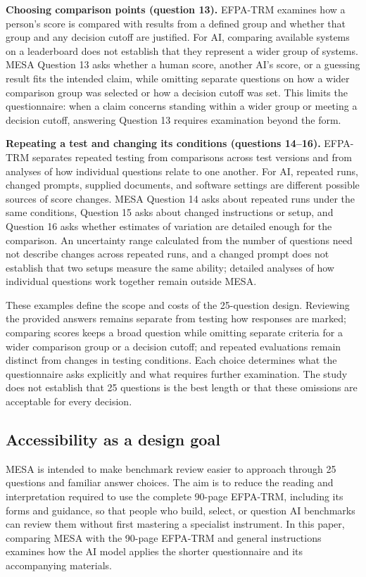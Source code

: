 \documentclass[10pt,conference]{IEEEtran}
\begin{document}
\textbf{Choosing comparison points (question 13).} EFPA-TRM examines how a person's score is compared with results from a defined group and whether that group and any decision cutoff are justified. For AI, comparing available systems on a leaderboard does not establish that they represent a wider group of systems. MESA Question 13 asks whether a human score, another AI's score, or a guessing result fits the intended claim, while omitting separate questions on how a wider comparison group was selected or how a decision cutoff was set. This limits the questionnaire: when a claim concerns standing within a wider group or meeting a decision cutoff, answering Question 13 requires examination beyond the form.

\textbf{Repeating a test and changing its conditions (questions 14--16).} EFPA-TRM separates repeated testing from comparisons across test versions and from analyses of how individual questions relate to one another. For AI, repeated runs, changed prompts, supplied documents, and software settings are different possible sources of score changes. MESA Question 14 asks about repeated runs under the same conditions, Question 15 asks about changed instructions or setup, and Question 16 asks whether estimates of variation are detailed enough for the comparison. An uncertainty range calculated from the number of questions need not describe changes across repeated runs, and a changed prompt does not establish that two setups measure the same ability; detailed analyses of how individual questions work together remain outside MESA.

These examples define the scope and costs of the 25-question design. Reviewing the provided answers remains separate from testing how responses are marked; comparing scores keeps a broad question while omitting separate criteria for a wider comparison group or a decision cutoff; and repeated evaluations remain distinct from changes in testing conditions. Each choice determines what the questionnaire asks explicitly and what requires further examination. The study does not establish that 25 questions is the best length or that these omissions are acceptable for every decision.

\subsection{Accessibility as a design goal}
MESA is intended to make benchmark review easier to approach through 25 questions and familiar answer choices. The aim is to reduce the reading and interpretation required to use the complete 90-page EFPA-TRM, including its forms and guidance, so that people who build, select, or question AI benchmarks can review them without first mastering a specialist instrument. In this paper, comparing MESA with the 90-page EFPA-TRM and general instructions examines how the AI model applies the shorter questionnaire and its accompanying materials.
\end{document}
